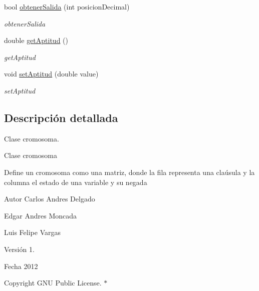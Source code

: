 \begin{DoxyCompactItemize}
bool \hyperlink{classCromosoma_a8a75eb52e417f9c050c32969b56984e7}{obtener\-Salida} (int posicion\-Decimal)
\begin{DoxyCompactList}\small\item\em obtener\-Salida \end{DoxyCompactList}\item 
double \hyperlink{classCromosoma_a280c8232e95aec0c8dd627cd579abec6}{get\-Aptitud} ()
\begin{DoxyCompactList}\small\item\em get\-Aptitud \end{DoxyCompactList}\item 
void \hyperlink{classCromosoma_a158f2fe672e3232ebf07a5724a15fc2e}{set\-Aptitud} (double value)
\begin{DoxyCompactList}\small\item\em set\-Aptitud \end{DoxyCompactList}\end{DoxyCompactItemize}


\subsection{Descripción detallada}
Clase cromosoma. 

\begin{DoxyVerb}Clase cromosoma
\end{DoxyVerb}


Define un cromosoma como una matriz, donde la fila representa una claúsula y la columna el estado de una variable y su negada \begin{DoxyAuthor}{Autor}
Carlos Andres Delgado 

Edgar Andres Moncada 

Luis Felipe Vargas 
\end{DoxyAuthor}
\begin{DoxyVersion}{Versión}
1. 
\end{DoxyVersion}
\begin{DoxyDate}{Fecha}
2012 
\end{DoxyDate}
\begin{DoxyCopyright}{Copyright}
G\-N\-U Public License. $\ast$ 
\end{DoxyCopyright}


